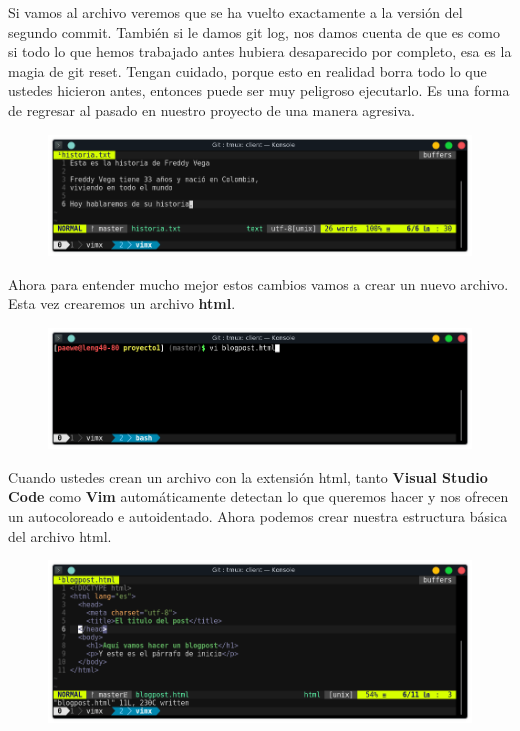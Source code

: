 \documentclass{article}
\begin{document}
Si vamos al archivo veremos que se ha vuelto exactamente a la versión del
segundo commit. También si le damos git log, nos damos cuenta de que es como si
todo lo que hemos trabajado antes hubiera desaparecido por completo, esa es la
magia de git reset. Tengan cuidado, porque esto en realidad borra todo lo que
ustedes hicieron antes, entonces puede ser muy peligroso ejecutarlo. Es una
forma de regresar al pasado en nuestro proyecto de una manera agresiva.\\

\newpage

\begin{figure}[h!]
  \centering
  \includegraphics[scale=0.75]{./Pictures/102_vi_txt.png}
\end{figure}

Ahora para entender mucho mejor estos cambios vamos a crear un nuevo archivo.
Esta vez crearemos un archivo \textbf{html}.


\begin{figure}[h!]
  \centering
  \includegraphics[scale=0.75]{./Pictures/103_blogpost.png}
\end{figure}

Cuando ustedes crean un archivo con la extensión html, tanto \textbf{Visual
Studio Code} como \textbf{Vim} automáticamente detectan lo que queremos hacer y
nos ofrecen un autocoloreado e autoidentado. Ahora podemos crear nuestra
estructura básica del archivo html.

\begin{figure}[h!]
  \centering
  \includegraphics[scale=0.75]{./Pictures/105_blopost.png}
\end{figure}
\end{document}
